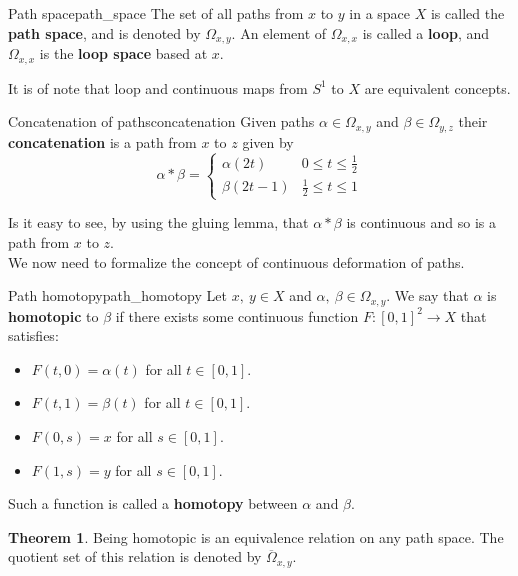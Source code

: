 \documentclass[a4paper]{book}
\theoremstyle{definition}
\newtheorem{theorem}{Theorem}[section]
\theoremstyle{ejemplo}
\theoremstyle{demostracion}
\begin{document}
\begin{define}{Path space}{path_space}
	The set of all paths from $x$ to $y$ in a space $X$ is called the \textbf{path space}, and is denoted by $\Omega_{x,y}$. An element of $\Omega_{x,x}$ is called a \textbf{loop}, and $\Omega_{x,x}$ is the \textbf{loop space} based at $x$.
\end{define}
It is of note that loop and continuous maps from $S^1$ to $X$ are equivalent concepts.

\begin{define}{Concatenation of paths}{concatenation}
	Given paths $\alpha \in \Omega_{x,y}$ and $\beta \in \Omega_{y,z}$ their \textbf{concatenation} is a path from $x$ to $z$ given by
	\begin{equation*}
		\alpha * \beta = \left\lbrace \begin{array}{lr}
			\alpha(2t) & 0 \leq t \leq \frac{1}{2} \\
			\beta(2t - 1) & \frac{1}{2} \leq t \leq 1
		\end{array}\right.
	\end{equation*}
\end{define}

Is it easy to see, by using the gluing lemma, that $\alpha * \beta$ is continuous and so is a path from $x$ to $z$.\\ 
We now need to formalize the concept of continuous deformation of paths.
\begin{define}{Path homotopy}{path_homotopy}
	Let $x,\ y \in X$ and $\alpha,\ \beta \in \Omega_{x,y}$. We say that $\alpha$ is \textbf{homotopic} to $\beta$ if there exists some continuous function $F : [0, 1]^2 \rightarrow X$ that satisfies:
	\begin{itemize}
		\item
		$F(t, 0) = \alpha(t)$ for all $t \in [0, 1]$.
		
		\item
		$F(t, 1) = \beta(t)$ for all $t \in [0, 1]$.
		
		 \item
		 $F(0, s) = x$ for all $s \in [0, 1]$.
		 
		 \item
		 $F(1, s) = y$ for all $s \in [0, 1]$.
	\end{itemize}
	Such a function is called a \textbf{homotopy} between $\alpha$ and $\beta$.
\end{define}

\begin{theorem}
	Being homotopic is an equivalence relation on any path space. The quotient set of this relation is denoted by $\overline{\Omega}_{x,y}$.
\end{theorem}
\end{document}
